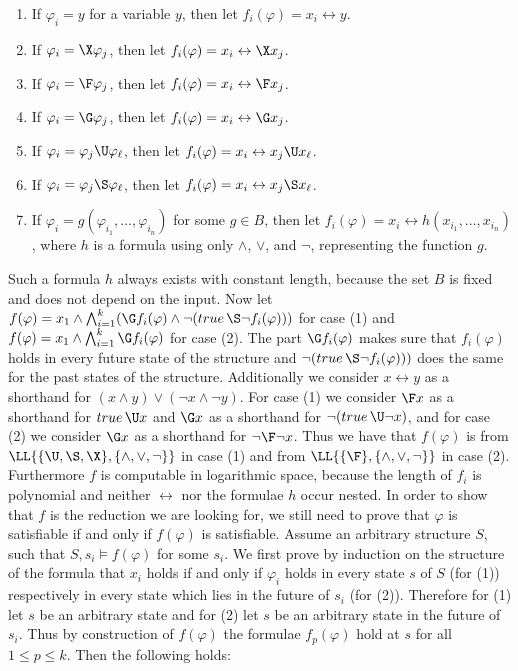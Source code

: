     \begin{enumerate}[$\bullet$]
    \item If $\varphi_i=y$ for a variable $y$, then let $f_i(\varphi) = x_i \leftrightarrow y$.
    \item If $\varphi_i=\X \varphi_j$, then let $f_i(\varphi) = x_i \leftrightarrow \X x_j$.
    \item If $\varphi_i=\F \varphi_j$, then let $f_i(\varphi) = x_i \leftrightarrow \F x_j$.
    \item If $\varphi_i=\G \varphi_j$, then let $f_i(\varphi) = x_i \leftrightarrow \G x_j$.
    \item If $\varphi_i=\varphi_j \U \varphi_\ell$, then let $f_i(\varphi) = x_i \leftrightarrow x_j \U x_\ell$.
    \item If $\varphi_i=\varphi_j \S \varphi_\ell$, then let $f_i(\varphi) = x_i \leftrightarrow x_j \S x_\ell$.
    \item If $\varphi_i=g(\varphi_{i_1},\dots, \varphi_{i_n})$ for some $g \in B$,
          then let $f_i(\varphi) = x_i \leftrightarrow h(x_{i_1},\dots,x_{i_n})$,
          where $h$ is a formula using only $\wedge$, $\vee$, and $\neg$, representing the function $g$.
    \end{enumerate}

    Such a formula $h$ always exists with constant length, because the set $B$ is fixed and does not depend on the input.
    Now let $f(\varphi)=x_1 \wedge \bigwedge_{i=1}^k (\G f_i(\varphi) \wedge \neg (\mathop{true} \S \neg f_i(\varphi)))$ for case (1) and
    $f(\varphi)=x_1 \wedge \bigwedge_{i=1}^k \G f_i(\varphi)$ for case (2). The part $\G f_i(\varphi)$ makes sure that $f_i(\varphi)$ holds in every
    future state of the structure and $\neg (\mathop{true} \S \neg f_i(\varphi)))$ does the same for the past states of the structure.
    Additionally we consider $x \leftrightarrow y$ as a shorthand for $(x \wedge y) \vee (\neg x \wedge \neg y)$.
For case (1) we consider $\F x$ as a shorthand for $\mathop{true} \U x$ and $\G x$
    as a shorthand for $\neg(\mathop{true} \U \neg x)$, and for case (2) we consider $\G x$ as a shorthand for $\neg\F\neg x$. Thus we have that $f(\varphi)$ is from $\LL{\{\U,\S,\X\},\{\wedge,\vee,\neg\}}$ in case (1) and from $\LL{\{\F\},\{\wedge,\vee,\neg\}}$ in case (2).
Furthermore $f$ is computable in logarithmic space, because the length of $f_i$ is polynomial
    and neither $\leftrightarrow$ nor the formulae $h$ occur nested. In order to show that
    $f$ is the reduction we are looking for, we still need to prove that $\varphi$ is satisfiable if and only if
    $f(\varphi)$ is satisfiable. Assume an arbitrary structure $S$, such that
    $S,s_i \vDash f(\varphi)$ for some $s_i$. We first prove by induction on the structure of the formula that $x_i$ holds if and only if $\varphi_i$ holds
    in every state $s$ of $S$ (for (1)) respectively in every state which lies in the future of $s_i$ (for (2)).
    Therefore for (1) let $s$ be an arbitrary state and for (2) let $s$ be an arbitrary state in the future of $s_i$. Thus by construction
    of $f(\varphi)$ the formulae $f_p(\varphi)$ hold at $s$ for all $1 \leq p \leq k$. Then the following holds:

